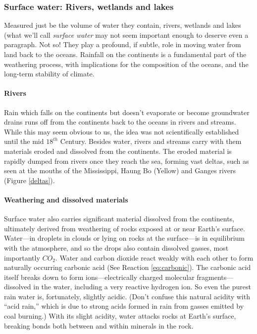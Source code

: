 \subsubsection{Surface water: Rivers, wetlands and lakes} \label{swrwl}
Measured just be the volume of water they contain, rivers, wetlands and lakes (what we'll call \emph{surface water} may not seem important enough to deserve even a paragraph. Not so! They play a profound, if subtle, role in moving water from land back to the oceans. Rainfall on the continents is a fundamental part of the weathering process, with implications for the composition of the oceans, and the long-term stability of climate.

\paragraph{Rivers} Rain which falls on the continents but doesn't evaporate or become groundwater drains runs off from the continents back to the oceans in rivers and streams. While this may seem obvious to us, the idea was not scientifically established until the mid $18^{th}$ Century. Besides water, rivers and streams carry with them materials eroded and dissolved from the continents. The eroded material is rapidly dumped from rivers once they reach the sea, forming vast deltas, such as seen at the mouths of the Mississippi, Haung Bo (Yellow) and Ganges rivers (Figure \ref{deltas}).
\paragraph{Weathering and dissolved materials} Surface water also carries significant material dissolved from the continents, ultimately derived from weathering of rocks exposed at or near Earth's surface. Water---in droplets in clouds or lying on rocks at the surface---is in equilibrium with the atmosphere, and so the drops also contain dissolved gasses, most importantly $CO_2$. Water and carbon dioxide react weakly with each other to form naturally occurring carbonic acid (See Reaction \ref{eq:carbonic}). The carbonic acid itself breaks down to form ions---electrically charged molecular fragments---dissolved in the water, including a very reactive hydrogen ion. So even the purest rain water is, fortunately, slightly acidic. (Don't confuse this natural acidity with ``acid rain,'' which is due to strong acids formed in rain from gasses emitted by coal burning.) With its slight acidity, water attacks rocks at Earth's surface, breaking bonds both between and within minerals in the rock.       
   
